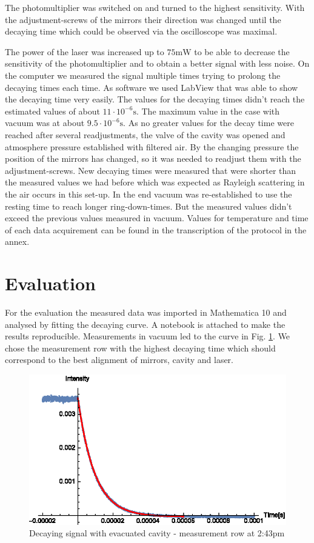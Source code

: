 \documentclass[
	parskip=half,10pt,
	numbers= noenddot, %
	toc=flat, %
	oneside,
	twocolumn,
	]{scrartcl}
\begin{document}
The photomultiplier was switched on and turned to the highest sensitivity. With the adjustment-screws of the mirrors their direction was changed until the decaying time 
which could be observed via the oscilloscope was maximal.

The power of the laser was increased up to $75\si{\milli \watt}$ to be able to decrease the sensitivity of the photomultiplier and to obtain a better signal with less noise.
On the computer we measured the signal multiple times trying to prolong the decaying times each time. As software we used LabView that was able to show the decaying time 
very easily. The values for the decaying times didn't reach the estimated values of about $11\cdot 10^{-6}\si{\second}$. The maximum value in the case with vacuum was 
at about $9.5\cdot 10^{-6}\si{\second}$.
As no greater values for the decay time were reached after several readjustments, the valve of the cavity was opened and atmosphere pressure established with filtered air. 
By the changing pressure the position of the mirrors has changed, so it was needed to readjust them with the adjustment-screws.
New decaying times were measured that were shorter than the measured values we had before which was expected as Rayleigh scattering in the air occurs in this set-up.
In the end vacuum was re-established to use the resting time to reach longer ring-down-times. But the measured values didn't exceed the previous values measured in 
vacuum. Values for temperature and time of each data acquirement can be found in the transcription of the protocol in the annex.


\section{Evaluation}
For the evaluation the measured data was imported in Mathematica 10 and analysed by fitting the decaying curve. A notebook is attached to make the results reproducible.
Measurements in vacuum led to the curve in Fig. \ref{fig:vacuum}. We chose the measurement row with the highest decaying time which should correspond to the best alignment 
of mirrors, cavity and laser. 

\begin{figure}[h]
\includegraphics[width=\textwidth/2]{images/vacuum.eps}
\caption{Decaying signal with evacuated cavity - measurement row at 2:43pm}
\label{fig:vacuum}
\end{figure}
\end{document}
